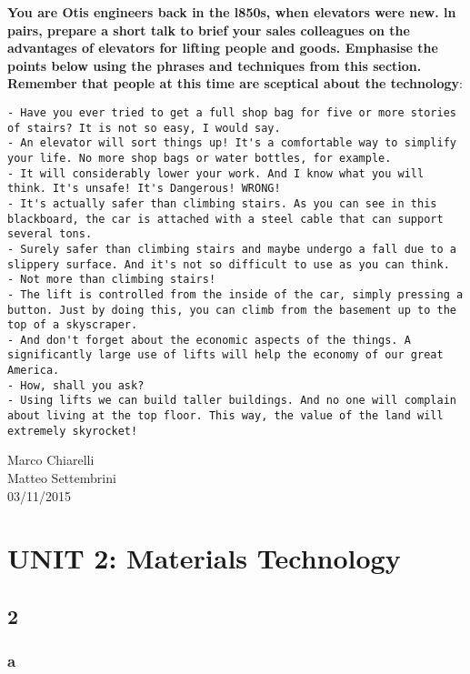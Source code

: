 \textbf{You are Otis engineers back in the l850s, when elevators were new. ln pairs, prepare a short talk to brief your sales colleagues on the advantages of elevators for lifting people and goods. Emphasise the points below using the phrases and techniques from this section. Remember that people at this time are sceptical about the technology}:

\begin{lstlisting}[breaklines=true]
- Have you ever tried to get a full shop bag for five or more stories of stairs? It is not so easy, I would say.
- An elevator will sort things up! It's a comfortable way to simplify your life. No more shop bags or water bottles, for example.
- It will considerably lower your work. And I know what you will think. It's unsafe! It's Dangerous! WRONG!
- It's actually safer than climbing stairs. As you can see in this blackboard, the car is attached with a steel cable that can support several tons. 
- Surely safer than climbing stairs and maybe undergo a fall due to a slippery surface. And it's not so difficult to use as you can think.
- Not more than climbing stairs!
- The lift is controlled from the inside of the car, simply pressing a button. Just by doing this, you can climb from the basement up to the top of a skyscraper. 
- And don't forget about the economic aspects of the things. A significantly large use of lifts will help the economy of our great America. 
- How, shall you ask?
- Using lifts we can build taller buildings. And no one will complain about living at the top floor. This way, the value of the land will extremely skyrocket! 

\end{lstlisting}

\begin{flushright}Marco Chiarelli\\Matteo Settembrini\\03/11/2015\end{flushright}


\section{UNIT 2: Materials Technology}

\subsection{2}

\subsubsection{a}

